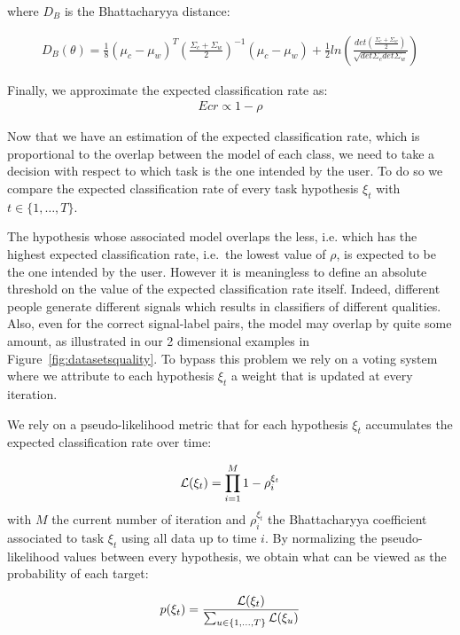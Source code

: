 where $D_B$ is the Bhattacharyya distance:

\begin{eqnarray}
D_B(\theta) = \frac{1}{8}(\mu_c-\mu_w)^T(\frac{\Sigma_c+\Sigma_w}{2})^{-1}(\mu_c-\mu_w)+\frac{1}{2}ln\left(\frac{det(\frac{\Sigma_c+\Sigma_w}{2})}{\sqrt{det\Sigma_c det\Sigma_w}}\right)
\end{eqnarray}

Finally, we approximate the expected classification rate as:
\begin{eqnarray}
Ecr \propto 1 - \rho
\end{eqnarray}

Now that we have an estimation of the expected classification rate, which is proportional to the overlap between the model of each class, we need to take a decision with respect to which task is the one intended by the user. To do so we compare the expected classification rate of every task hypothesis $\xi_t$ with $t \in \{1, \ldots, T\}$. 

The hypothesis whose associated model overlaps the less, i.e. which has the highest expected classification rate, i.e.\ the lowest value of $\rho$, is expected to be the one intended by the user. However it is meaningless to define an absolute threshold on the value of the expected classification rate itself. Indeed, different people generate different signals which results in classifiers of different qualities. Also, even for the correct signal-label pairs, the model may overlap by quite some amount, as illustrated in our 2 dimensional examples in Figure~\ref{fig:datasetsquality}. To bypass this problem we rely on a voting system where we attribute to each hypothesis $\xi_t$ a weight that is updated at every iteration.

We rely on a pseudo-likelihood metric that for each hypothesis $\xi_t$ accumulates the expected classification rate over time:

\begin{eqnarray}
\mathcal{L}(\xi_t) = \prod_{i = 1}^{M} 1 - \rho_i^{\xi_t}
\end{eqnarray}
%
with $M$ the current number of iteration and $\rho_i^{\xi_t}$ the Bhattacharyya coefficient associated to task $\xi_t$ using all data up to time $i$. By normalizing the pseudo-likelihood values between every hypothesis, we obtain what can be viewed as the probability of each target:

\begin{eqnarray}
p(\xi_t) = \frac{\mathcal{L}(\xi_t)}{\sum_{u \in \{1, \ldots, T\}} \mathcal{L}(\xi_u)}
\end{eqnarray}

